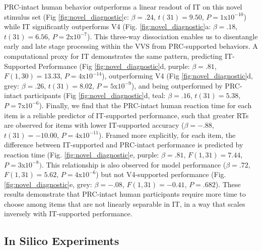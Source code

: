 \documentclass[11pt]{article}
\begin{document}
PRC-intact human behavior outperforms a linear readout of IT on this novel stimulus set (Fig \ref{fig:novel_diagnostic}c:  $\beta = .24$,  $t(31) = 9.50$, $P = 1$x$10^{-10}$) while IT significantly outperforms V4 (Fig. \ref{fig:novel_diagnostic}a:  $\beta = .18$,  $t(31) = 6.56$, $P = 2$x$10^{-7}$). This three-way dissociation enables us to disentangle early and late stage processing within the VVS from PRC-supported behaviors. A computational proxy for IT demonstrates the same pattern, predicting IT-Supported Performance (Fig \ref{fig:novel_diagnostic}d, purple: $\beta = .81$, $F(1, 30) = 13.33$, $P = 4$x$10^{-14}$), outperforming V4 (Fig \ref{fig:novel_diagnostic}d, grey: $\beta = .26$,  $t(31) = 8.02$, $P = 5$x$10^{-9}$), and being outperformed by PRC-intact participants (Fig \ref{fig:novel_diagnostic}d, teal: $\beta = .16$, $t(31) = 5.38$, $P = 7$x$10^{-6}$). Finally, we find that the PRC-intact human reaction time for each item is a reliable predictor of IT-supported performance, such that greater RTs are observed for items with lower IT-supported accuracy ($\beta = -.88$,  $t(31) = -10.00$, $P = 4$x$10^{-11}$). Framed more explicitly, for each item, the difference between IT-supported and PRC-intact performance is predicted by reaction time (Fig. \ref{fig:novel_diagnostic}e, purple: $\beta = .81$,  $F(1, 31) = 7.44$, $P = 3$x$10^{-8})$. This relationship is also observed for model performance ($\beta = .72$,  $F(1, 31) = 5.62$, $P = 4$x$10^{-6}$) but not V4-supported performance (Fig. \ref{fig:novel_diagnostic}e, grey: $\beta = -.08$,  $F(1, 31) = -0.41$, $P = .682$). These results demonstrate that PRC-intact human participants require more time to choose among items that are not linearly separable in IT, in a way that scales inversely with IT-supported performance. 

\subsection{In Silico Experiments} 
\end{document}

